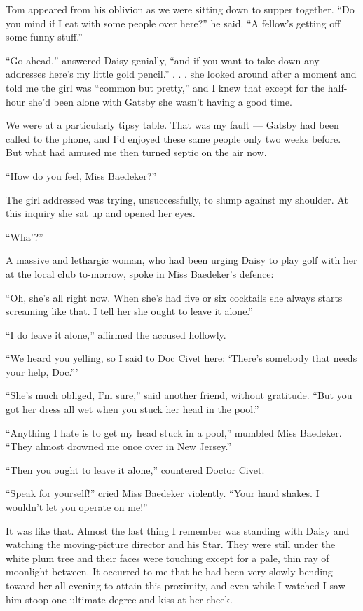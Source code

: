 \documentclass{znotebook}
\begin{document}
Tom appeared from his oblivion as we were sitting down to supper together. ``Do you mind if I eat with some people over here?'' he said. ``A fellow's getting off some funny stuff.''

``Go ahead,'' answered Daisy genially, ``and if you want to take down any addresses here's my little gold pencil.'' . . . she looked around after a moment and told me the girl was ``common but pretty,'' and I knew that except for the half-hour she'd been alone with Gatsby she wasn't having a good time.

We were at a particularly tipsy table. That was my fault — Gatsby had been called to the phone, and I'd enjoyed these same people only two weeks before. But what had amused me then turned septic on the air now.

``How do you feel, Miss Baedeker?''

The girl addressed was trying, unsuccessfully, to slump against my shoulder. At this inquiry she sat up and opened her eyes.

``Wha'?''

A massive and lethargic woman, who had been urging Daisy to play golf with her at the local club to-morrow, spoke in Miss Baedeker's defence:

``Oh, she's all right now. When she's had five or six cocktails she always starts screaming like that. I tell her she ought to leave it alone.''

``I do leave it alone,'' affirmed the accused hollowly.

``We heard you yelling, so I said to Doc Civet here: ‘There's somebody that needs your help, Doc.'''

``She's much obliged, I'm sure,'' said another friend, without gratitude. ``But you got her dress all wet when you stuck her head in the pool.''

``Anything I hate is to get my head stuck in a pool,'' mumbled Miss Baedeker. ``They almost drowned me once over in New Jersey.''

``Then you ought to leave it alone,'' countered Doctor Civet.

``Speak for yourself!'' cried Miss Baedeker violently. ``Your hand shakes. I wouldn't let you operate on me!''

It was like that. Almost the last thing I remember was standing with Daisy and watching the moving-picture director and his Star. They were still under the white plum tree and their faces were touching except for a pale, thin ray of moonlight between. It occurred to me that he had been very slowly bending toward her all evening to attain this proximity, and even while I watched I saw him stoop one ultimate degree and kiss at her cheek.
\end{document}
